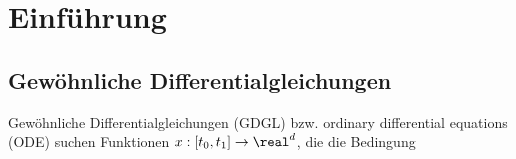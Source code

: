 
\chapter{Einführung}
\section{Gewöhnliche Differentialgleichungen}
Gewöhnliche Differentialgleichungen (GDGL) bzw. ordinary differential
equations (ODE) suchen Funktionen $x : [t_0, t_1] \to \real^d$, die die
Bedingung 